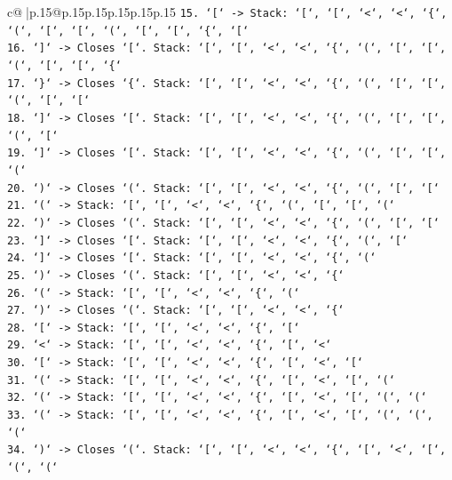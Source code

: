 \documentclass{article}
\begin{document}
{\begin{supertabular}{c@{$\;$}|p{.15\linewidth}@{}p{.15\linewidth}p{.15\linewidth}p{.15\linewidth}p{.15\linewidth}p{.15\linewidth}}
{{{\texttt{15. `{[}` {-}> Stack: `{[}`, `{[}`, `<`, `<`, `\{`, `(`, `{[}`, `{[}`, `(`, `{[}`, `{[}`, `\{`, `{[}`} \\
\texttt{16. `{]}` {-}> Closes `{[}`. Stack: `{[}`, `{[}`, `<`, `<`, `\{`, `(`, `{[}`, `{[}`, `(`, `{[}`, `{[}`, `\{`} \\
\texttt{17. `\}` {-}> Closes `\{`. Stack: `{[}`, `{[}`, `<`, `<`, `\{`, `(`, `{[}`, `{[}`, `(`, `{[}`, `{[}`} \\
\texttt{18. `{]}` {-}> Closes `{[}`. Stack: `{[}`, `{[}`, `<`, `<`, `\{`, `(`, `{[}`, `{[}`, `(`, `{[}`} \\
\texttt{19. `{]}` {-}> Closes `{[}`. Stack: `{[}`, `{[}`, `<`, `<`, `\{`, `(`, `{[}`, `{[}`, `(`} \\
\texttt{20. `)` {-}> Closes `(`. Stack: `{[}`, `{[}`, `<`, `<`, `\{`, `(`, `{[}`, `{[}`} \\
\texttt{21. `(` {-}> Stack: `{[}`, `{[}`, `<`, `<`, `\{`, `(`, `{[}`, `{[}`, `(`} \\
\texttt{22. `)` {-}> Closes `(`. Stack: `{[}`, `{[}`, `<`, `<`, `\{`, `(`, `{[}`, `{[}`} \\
\texttt{23. `{]}` {-}> Closes `{[}`. Stack: `{[}`, `{[}`, `<`, `<`, `\{`, `(`, `{[}`} \\
\texttt{24. `{]}` {-}> Closes `{[}`. Stack: `{[}`, `{[}`, `<`, `<`, `\{`, `(`} \\
\texttt{25. `)` {-}> Closes `(`. Stack: `{[}`, `{[}`, `<`, `<`, `\{`} \\
\texttt{26. `(` {-}> Stack: `{[}`, `{[}`, `<`, `<`, `\{`, `(`} \\
\texttt{27. `)` {-}> Closes `(`. Stack: `{[}`, `{[}`, `<`, `<`, `\{`} \\
\texttt{28. `{[}` {-}> Stack: `{[}`, `{[}`, `<`, `<`, `\{`, `{[}`} \\
\texttt{29. `<` {-}> Stack: `{[}`, `{[}`, `<`, `<`, `\{`, `{[}`, `<`} \\
\texttt{30. `{[}` {-}> Stack: `{[}`, `{[}`, `<`, `<`, `\{`, `{[}`, `<`, `{[}`} \\
\texttt{31. `(` {-}> Stack: `{[}`, `{[}`, `<`, `<`, `\{`, `{[}`, `<`, `{[}`, `(`} \\
\texttt{32. `(` {-}> Stack: `{[}`, `{[}`, `<`, `<`, `\{`, `{[}`, `<`, `{[}`, `(`, `(`} \\
\texttt{33. `(` {-}> Stack: `{[}`, `{[}`, `<`, `<`, `\{`, `{[}`, `<`, `{[}`, `(`, `(`, `(`} \\
\texttt{34. `)` {-}> Closes `(`. Stack: `{[}`, `{[}`, `<`, `<`, `\{`, `{[}`, `<`, `{[}`, `(`, `(`} \\
}}}
\end{supertabular}}
\end{document}
